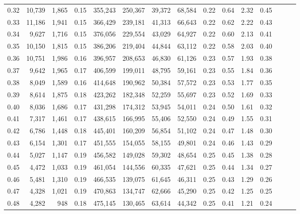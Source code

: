 \begin{tabular}{rrrrrrrrrrrrrrr}
0.32 &  10,739 &  1,865 &  0.15 &  355,243 &  250,367 &   39,372 &   68,584 &  0.22 &  0.64 &  2.32 &      0.45 \\
0.33 &  11,186 &  1,941 &  0.15 &  366,429 &  239,181 &   41,313 &   66,643 &  0.22 &  0.62 &  2.22 &      0.43 \\
0.34 &   9,627 &  1,716 &  0.15 &  376,056 &  229,554 &   43,029 &   64,927 &  0.22 &  0.60 &  2.13 &      0.41 \\
0.35 &  10,150 &  1,815 &  0.15 &  386,206 &  219,404 &   44,844 &   63,112 &  0.22 &  0.58 &  2.03 &      0.40 \\
0.36 &  10,751 &  1,986 &  0.16 &  396,957 &  208,653 &   46,830 &   61,126 &  0.23 &  0.57 &  1.93 &      0.38 \\
0.37 &   9,642 &  1,965 &  0.17 &  406,599 &  199,011 &   48,795 &   59,161 &  0.23 &  0.55 &  1.84 &      0.36 \\
0.38 &   8,049 &  1,589 &  0.16 &  414,648 &  190,962 &   50,384 &   57,572 &  0.23 &  0.53 &  1.77 &      0.35 \\
0.39 &   8,614 &  1,875 &  0.18 &  423,262 &  182,348 &   52,259 &   55,697 &  0.23 &  0.52 &  1.69 &      0.33 \\
0.40 &   8,036 &  1,686 &  0.17 &  431,298 &  174,312 &   53,945 &   54,011 &  0.24 &  0.50 &  1.61 &      0.32 \\
0.41 &   7,317 &  1,461 &  0.17 &  438,615 &  166,995 &   55,406 &   52,550 &  0.24 &  0.49 &  1.55 &      0.31 \\
0.42 &   6,786 &  1,448 &  0.18 &  445,401 &  160,209 &   56,854 &   51,102 &  0.24 &  0.47 &  1.48 &      0.30 \\
0.43 &   6,154 &  1,301 &  0.17 &  451,555 &  154,055 &   58,155 &   49,801 &  0.24 &  0.46 &  1.43 &      0.29 \\
0.44 &   5,027 &  1,147 &  0.19 &  456,582 &  149,028 &   59,302 &   48,654 &  0.25 &  0.45 &  1.38 &      0.28 \\
0.45 &   4,472 &  1,033 &  0.19 &  461,054 &  144,556 &   60,335 &   47,621 &  0.25 &  0.44 &  1.34 &      0.27 \\
0.46 &   5,481 &  1,310 &  0.19 &  466,535 &  139,075 &   61,645 &   46,311 &  0.25 &  0.43 &  1.29 &      0.26 \\
0.47 &   4,328 &  1,021 &  0.19 &  470,863 &  134,747 &   62,666 &   45,290 &  0.25 &  0.42 &  1.25 &      0.25 \\
0.48 &   4,282 &    948 &  0.18 &  475,145 &  130,465 &   63,614 &   44,342 &  0.25 &  0.41 &  1.21 &      0.24 \\

\end{tabular}
